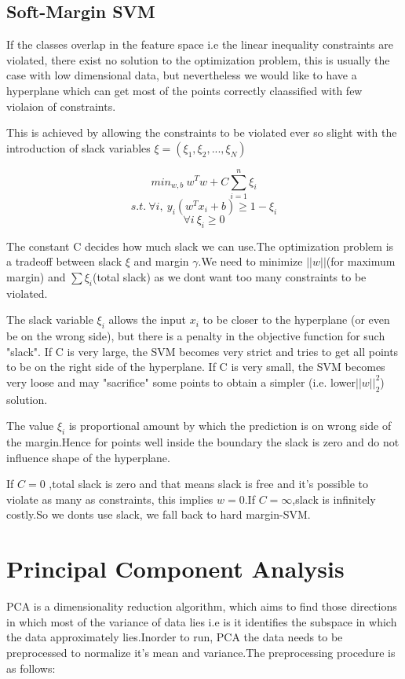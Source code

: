 \documentclass[12pt]{article}
\begin{document}
 
 \subsection{Soft-Margin SVM}
 
 
 If the classes  overlap in the feature space i.e the linear inequality constraints are violated, there exist no solution to the optimization problem, this is usually the case with low dimensional data, but nevertheless we would like to have a hyperplane which can get most of the points correctly claassified with few violaion of constraints.
 
 
This is achieved by allowing the constraints to be violated ever so slight with the introduction of slack variables $\xi = (\xi_{1},\xi_{2}, ..., \xi_{N})$ 
   
   $$min_{w,b} \  w^{T}w + C \sum_{i =1}^{n} \xi_{i}$$
   $$ s.t. \ \forall i, \ y_{i}(w^{T}x_{i} + b) \geq 1- \xi_{i}$$
   $$ \forall i \ \xi_{i} \geq 0$$ 
   
The constant C decides how much slack we can use.The optimization problem  is a tradeoff between slack $ \xi$ and margin $\gamma$.We need to minimize $\vert \vert w \vert \vert$(for maximum margin) and $\sum \xi_{i}$(total slack) as we dont want too many constraints to be violated.
  
 The slack variable $\xi_{i}$ allows the input $x_{i}$ to be closer to the hyperplane (or even be on the wrong side), but there is a penalty in the objective function for such "slack". If C is very large, the SVM becomes very strict and tries to get all points to be on the right side of the hyperplane. If C is very small, the SVM becomes very loose and may "sacrifice" some points to obtain a simpler (i.e. lower$ \vert \vert w \vert \vert_{2} ^{2}$) solution. 
 
 The value $\xi_{i}$ is proportional amount by which the prediction is on wrong side of the margin.Hence for points well inside the boundary the slack is zero and do not influence shape of the hyperplane.
 
 If $C =0 $ ,total slack is zero and that means slack is free and it's possible to violate as many as constraints, this implies $w = 0$.If $C = \infty$,slack is infinitely costly.So we donts use slack, we fall back to hard margin-SVM. 
 
 \section{Principal Component Analysis}
PCA is a dimensionality reduction algorithm, which aims to find those directions in which most of the variance of data lies i.e is it  identifies the subspace in which the data approximately lies.Inorder to run, PCA the data needs to be preprocessed to normalize it's mean and variance.The preprocessing procedure is as follows:
\end{document}
